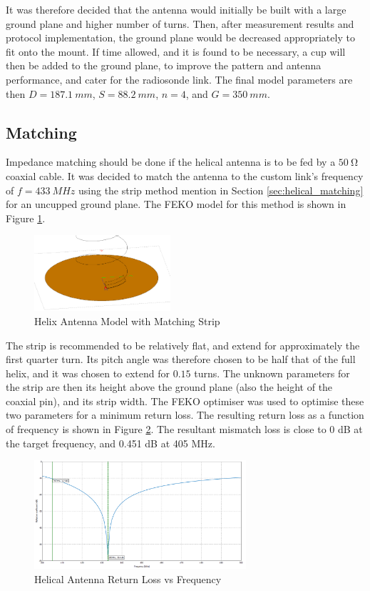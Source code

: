 It was therefore decided that the antenna would initially be built with a large ground plane and higher number of turns. Then, after measurement results and protocol implementation, the ground plane would be decreased appropriately to fit onto the mount. If time allowed, and it is found to be necessary, a cup will then be added to the ground plane, to improve the pattern and antenna performance, and cater for the radiosonde link. The final model parameters are then $D = \SI{187.1}{mm}$, $S = \SI{88.2}{mm}$, $n = 4$, and $G = \SI{350}{mm}$.

\subsection{Matching}
Impedance matching should be done if the helical antenna is to be fed by a $\SI{50}{\ohm}$ coaxial cable. It was decided to match the antenna to the custom link's frequency of $f = \SI{433}{MHz}$ using the strip method mention in Section \ref{sec:helical_matching} for an uncupped ground plane. The FEKO model for this method is shown in Figure \ref{fig:helix7_model}.

\begin{figure}[!htb]
  \centering
  \includegraphics[width=0.45\textwidth]{helix7_model}
  \caption{Helix Antenna Model with Matching Strip}
  \label{fig:helix7_model}
\end{figure}

The strip is recommended to be relatively flat, and extend for approximately the first quarter turn. Its pitch angle was therefore chosen to be half that of the full helix, and it was chosen to extend for $0.15$ turns. The unknown parameters for the strip are then its height above the ground plane (also the height of the coaxial pin), and its strip width. The FEKO optimiser was used to optimise these two parameters for a minimum return loss. The resulting return loss as a function of frequency is shown in Figure \ref{fig:helix7_returnLoss}. The resultant mismatch loss is close to 0 dB at the target frequency, and 0.451 dB at 405 MHz.

\begin{figure}[!htb]
  \centering
  \includegraphics[width=0.7\textwidth]{helix7_returnLoss}
  \caption{Helical Antenna Return Loss vs Frequency}
  \label{fig:helix7_returnLoss}
\end{figure}

